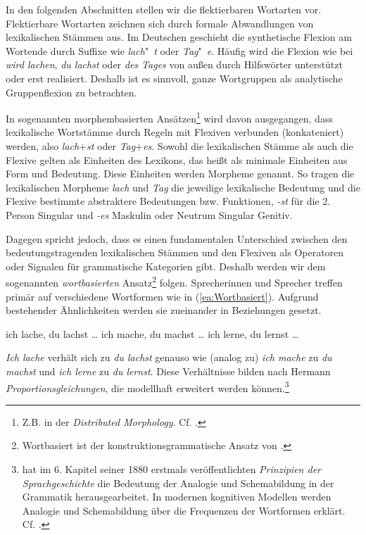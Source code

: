 In den folgenden Abschnitten stellen wir die flektierbaren Wortarten vor. Flektierbare Wortarten zeichnen sich durch formale Abwandlungen von lexikalischen Stämmen aus. Im Deutschen geschieht die synthetische Flexion am Wortende durch Suffixe wie \textit{lach}"~\textit{t} oder \textit{Tag}"~\textit{e}. Häufig wird die Flexion wie bei \textit{wird lachen}, \textit{du lachst} oder \textit{des Tages} von außen durch Hilfswörter unterstützt oder erst realisiert. Deshalb ist es sinnvoll, ganze Wortgruppen als analytische Gruppenflexion zu betrachten. 

\newpage
In sogenannten morphembasierten Ansätzen\footnote{Z.B. in der \textit{Distributed Morphology}. Cf. \citet{HarleyNoyer1999}.} wird davon ausgegangen, dass lexikalische Wortstämme durch Regeln mit Flexiven verbunden (konkateniert) werden, also \textit{lach}+\textit{st} oder \textit{Tag}+\textit{es}. Sowohl die lexikalischen Stämme als auch die Flexive gelten als Einheiten des Lexikons, das heißt als minimale Einheiten aus Form und Bedeutung. Diese Einheiten werden Morpheme genannt. So tragen die lexikalischen Morpheme \textit{lach} und \textit{Tag} die jeweilige lexikalische Bedeutung und die Flexive bestimmte abstraktere Bedeutungen bzw. Funktionen, \zB \textit{-st} für die 2. Person Singular und \textit{-es} Maskulin oder Neutrum Singular Genitiv.

Dagegen spricht jedoch, dass es einen fundamentalen Unterschied zwischen den bedeutungstragenden lexikalischen Stämmen und den Flexiven als Operatoren oder Signalen für grammatische Kategorien gibt. Deshalb werden wir dem sogenannten \textit{wortbasierten} Ansatz\footnote{Wortbasiert ist \zB der konstruktionsgrammatische Ansatz von \citet{Booij2010}.} folgen. Sprecherinnen und Sprecher treffen primär auf verschiedene Wortformen wie in (\ref{ea:Wortbasiert}). Aufgrund bestehender Ähnlichkeiten werden sie zueinander in Beziehungen gesetzt.

\ea \label{ea:Wortbasiert}
\ea \label{ea:lach_e} ich lache, du lachst \ldots{}
\ex \label{ex:mach_e} ich mache, du machst \ldots{} 
\ex \label{ex:lern_e} ich lerne, du lernst \ldots{} 
\z 
\z 

\textit{Ich lache} verhält sich zu \textit{du lachst} genauso wie (analog zu) \textit{ich mache} zu \textit{du machst} und \textit{ich lerne} zu \textit{du lernst}. Diese Verhältnisse bilden nach Hermann \citet[107--108]{Paul1880} \textit{Proportionsgleichungen}, die modellhaft erweitert werden können.\footnote{\citet{Paul1880} hat im 6. Kapitel seiner 1880 erstmals veröffentlichten \textit{Prinzipien der Sprachgeschichte} die Bedeutung der Analogie und Schemabildung in der Grammatik herausgearbeitet. In modernen kognitiven Modellen werden Analogie und Schemabildung über die Frequenzen der Wortformen erklärt. Cf. \citet[58--64, 75]{Bybee2010}.}

